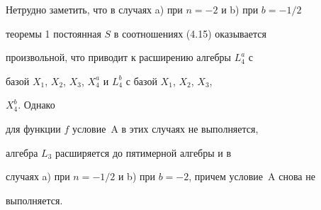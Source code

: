  


Нетрудно заметить, что в случаях a) при $n=-2$ и b) при $b=-1/2$ 


теоремы 1 постоянная $S$ в соотношениях (4.15) оказывается 


произвольной, что приводит к расширению алгебры $L^a_4$ с 


базой $X_1$, $X_2$, $X_3$, $X^a_4$ и $L^b_4$ с базой $X_1$, $X_2$, $X_3$, 


$X^b_4$. Однако 


для функции $f$ условие~A в этих случаях не выполняется, 


алгебра $L_3$ расширяется до пятимерной алгебры и в 


случаях a) при $n=-1/2$ и b) при $b=-2$, причем условие~A снова не 


выполняется. 


 


 


